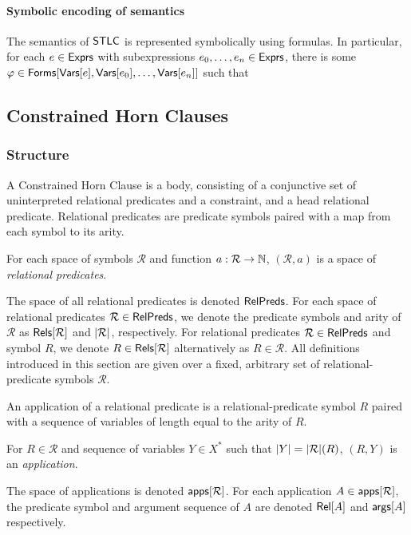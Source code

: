 \paragraph{Symbolic encoding of semantics}
%
The semantics of $\mathsf{STLC}$ is represented symbolically using \lia
formulas.
%
%
In particular, for each $e \in \mathsf{Exprs}$ with subexpressions $e_0,
\ldots, e_n \in \mathsf{Exprs}$, there is some $\varphi \in \mathsf{Forms}[ \mathsf{Vars}[e],
  \mathsf{Vars}[e_0], \ldots, \mathsf{Vars}[e_n] ]$ such that


\subsection{Constrained Horn Clauses}
\label{sec:chcs}

\subsubsection{Structure}
A Constrained Horn Clause is a body, consisting of a conjunctive set
of uninterpreted relational predicates and a constraint, and a head
relational predicate.
%
Relational predicates are predicate symbols paired with a map from
each symbol to its arity.
%
\begin{defn}
  \label{defn:rel-preds}
  For each space of symbols $\mathcal{R}$ and function $a: \mathcal{R}
  \to \mathbb{N}$, $(\mathcal{R}, a)$ is a space of \emph{relational
    predicates}.
\end{defn}
%
The space of all relational predicates is denoted $\mathsf{RelPreds}$.
%
For each space of relational predicates $\mathcal{R} \in \mathsf{RelPreds}$,
we denote the predicate symbols and arity of $\mathcal{R}$ as
$\mathsf{Rels}[ \mathcal{R} ]$ and $|\mathcal{R}|$, respectively.
%
For relational predicates $\mathcal{R} \in \mathsf{RelPreds}$ and symbol $R$,
we denote $R \in \mathsf{Rels}[  \mathcal{R}  ]$ alternatively as $R \in
\mathcal{R}$.
%
All definitions introduced in this section are given over a fixed,
arbitrary set of relational-predicate symbols $\mathcal{R}$.

An application of a relational predicate is a relational-predicate
symbol $R$ paired with a sequence of variables of length equal to the
arity of $R$.
%
\begin{defn}
  \label{defn:pred-apps}
  For $R \in \mathcal{R}$ and sequence of variables $Y \in X^{*}$ such
  that $|Y| = |\mathcal{R}|(R)$, $(R, Y)$ is an
  \emph{application}.
\end{defn}
%
The space of applications is denoted $\mathsf{apps}[ \mathcal{R} ]$.
%
For each application $A \in \mathsf{apps}[ \mathcal{R} ]$, the predicate symbol
and argument sequence of $A$ are denoted $\mathsf{Rel}[ A ]$ and $\mathsf{args}[ A ]$
respectively.


